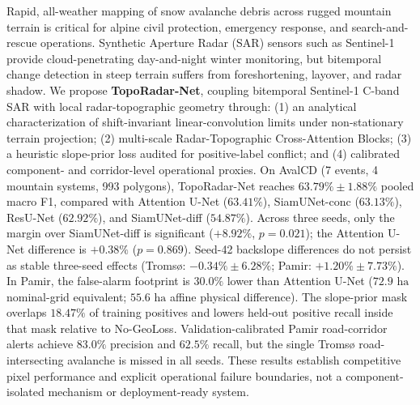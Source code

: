 Rapid, all-weather mapping of snow avalanche debris across rugged mountain terrain is critical for alpine civil protection, emergency response, and search-and-rescue operations. Synthetic Aperture Radar (SAR) sensors such as Sentinel-1 provide cloud-penetrating day-and-night winter monitoring, but bitemporal change detection in steep terrain suffers from foreshortening, layover, and radar shadow. We propose \textbf{TopoRadar-Net}, coupling bitemporal Sentinel-1 C-band SAR with local radar-topographic geometry through: (1) an analytical characterization of shift-invariant linear-convolution limits under non-stationary terrain projection; (2) multi-scale Radar-Topographic Cross-Attention Blocks; (3) a heuristic slope-prior loss audited for positive-label conflict; and (4) calibrated component- and corridor-level operational proxies. On AvalCD (7 events, 4 mountain systems, 993 polygons), TopoRadar-Net reaches $63.79\% \pm 1.88\%$ pooled macro F1, compared with Attention U-Net ($63.41\%$), SiamUNet-conc ($63.13\%$), ResU-Net ($62.92\%$), and SiamUNet-diff ($54.87\%$). Across three seeds, only the margin over SiamUNet-diff is significant ($+8.92\%$, $p=0.021$); the Attention U-Net difference is $+0.38\%$ ($p=0.869$). Seed-42 backslope differences do not persist as stable three-seed effects (Troms{\o}: $-0.34\% \pm 6.28\%$; Pamir: $+1.20\% \pm 7.73\%$). In Pamir, the false-alarm footprint is $30.0\%$ lower than Attention U-Net ($72.9\text{ ha}$ nominal-grid equivalent; $55.6\text{ ha}$ affine physical difference). The slope-prior mask overlaps $18.47\%$ of training positives and lowers held-out positive recall inside that mask relative to No-GeoLoss. Validation-calibrated Pamir road-corridor alerts achieve $83.0\%$ precision and $62.5\%$ recall, but the single Troms{\o} road-intersecting avalanche is missed in all seeds. These results establish competitive pixel performance and explicit operational failure boundaries, not a component-isolated mechanism or deployment-ready system.
